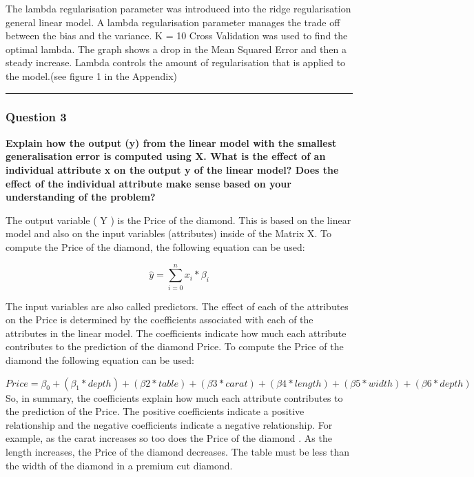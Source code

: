 \documentclass[
]{article}
\begin{document}
The lambda regularisation parameter was introduced into the ridge
regularisation general linear model. A lambda regularisation parameter
manages the trade off between the bias and the variance. K = 10 Cross
Validation was used to find the optimal lambda. The graph shows a drop
in the Mean Squared Error and then a steady increase. Lambda controls
the amount of regularisation that is applied to the model.(see figure 1
in the Appendix)

\begin{center}\rule{0.5\linewidth}{0.5pt}\end{center}

\hypertarget{question-3}{%
\subsubsection{Question 3}\label{question-3}}

\textbf{Explain how the output (y) from the linear model with the
smallest generalisation} \textbf{error is computed using X. What is the
effect of an individual attribute x on the} \textbf{output y of the
linear model? Does the effect of the individual attribute make sense}
\textbf{based on your understanding of the problem?}

The output variable ( Y ) is the Price of the diamond. This is based on
the linear model and also on the input variables (attributes) inside of
the Matrix X. To compute the Price of the diamond, the following
equation can be used:

\[\hat{y} =  \sum_{i = 0}^{n} x_{i} * \beta_{i}\]

The input variables are also called predictors. The effect of each of
the attributes on the Price is determined by the coefficients associated
with each of the attributes in the linear model. The coefficients
indicate how much each attribute contributes to the prediction of the
diamond Price. To compute the Price of the diamond the following
equation can be used:

\[ Price = \beta_{0} + (\beta_{1} * depth) + (\beta{2} * table)  + (\beta{3} * carat) + (\beta{4} * length ) + (\beta{5} * width ) + (\beta{6} * depth )\]
So, in summary, the coefficients explain how much each attribute
contributes to the prediction of the Price. The positive coefficients
indicate a positive relationship and the negative coefficients indicate
a negative relationship. For example, as the carat increases so too does
the Price of the diamond . As the length increases, the Price of the
diamond decreases. The table must be less than the width of the diamond
in a premium cut diamond.
\end{document}
